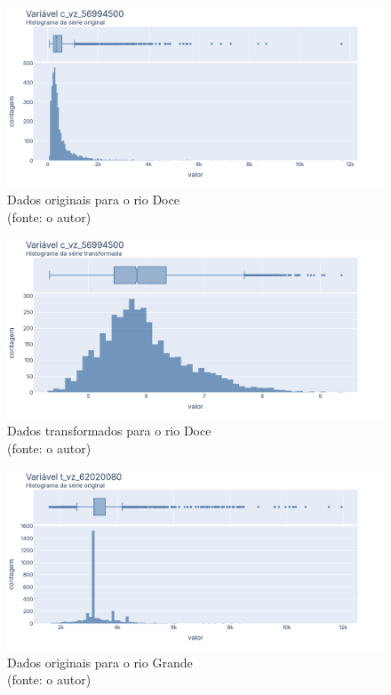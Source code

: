 \begin{figure}[!h]
	\centering
	\includegraphics[scale=0.33]{Figuras/rio_doce/rio_doce_antes_log.png}
	\caption{Dados originais para o rio Doce\\(fonte: o autor)}
	\label{fig:rio_doce_antes_log}
\end{figure}

\begin{figure}[!h]
	\centering
	\includegraphics[scale=0.33]{Figuras/rio_doce/rio_doce_depois_log.png}
	\caption{Dados transformados para o rio Doce\\(fonte: o autor)}
	\label{fig:rio_doce_depois_log}
\end{figure}

\begin{figure}[!h]
	\centering
	\includegraphics[scale=0.33]{Figuras/rio_grande/rio_grande_antes_log.png}
	\caption{Dados originais para o rio Grande\\(fonte: o autor)}
	\label{fig:rio_grande_antes_log}
\end{figure}

